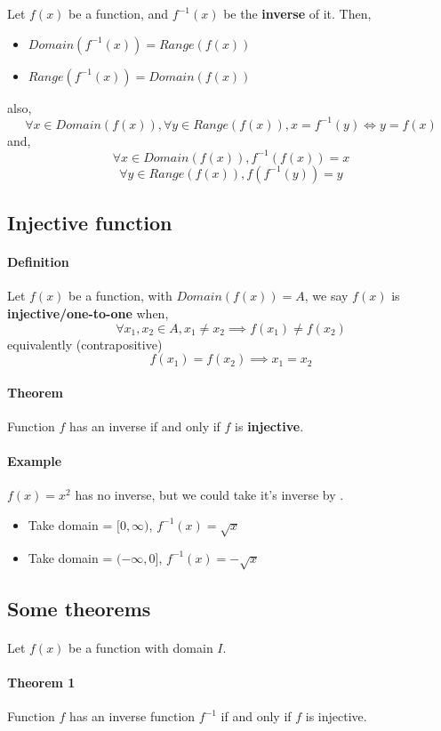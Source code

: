\documentclass{article}
\begin{document}
	Let $f(x)$ be a function, and $f^{-1}(x)$ be the \textbf{inverse} of it. Then,
	\begin{itemize}
		\item $Domain(f^{-1}(x)) = Range(f(x))$
		\item $Range(f^{-1}(x)) = Domain(f(x))$
	\end{itemize}
	also,
	\[
	\forall x \in Domain(f(x)), \forall y \in Range(f(x)),
	x = f^{-1}(y) \iff y = f(x)
	\]
	and,
	\[
	\forall x \in Domain(f(x)), f^{-1}(f(x)) = x
	\]
	\[
	\forall y \in Range(f(x)), f(f^{-1}(y)) = y
	\]
	\subsection{Injective function}
	\paragraph{Definition} Let $f(x)$ be a function, with $Domain(f(x))=A$, we say $f(x)$ is \textbf{injective/one-to-one} when,
	\[
	\forall x_1, x_2 \in A, x_1 \neq x_2 \implies f(x_1) \neq f(x_2)
	\]
	equivalently (contrapositive)
	\[
	f(x_1) = f(x_2) \implies x_1 = x_2
	\]
	\paragraph{Theorem} Function $f$ has an inverse if and only if $f$ is \textbf{injective}.
	\paragraph{Example} $f(x)=x^2$ has no inverse, but we could take it's inverse by .
	\begin{itemize}
		\item Take domain = $[0, \infty)$, $f^{-1}(x) = \sqrt{x}$
		\item Take domain = $(-\infty, 0]$, $f^{-1}(x) = - \sqrt{x}$
	\end{itemize}
	\subsection{Some theorems}
	\paragraph{} Let $f(x)$ be a function with domain $I$.
	\paragraph{Theorem 1} Function $f$ has an inverse function $f^{-1}$ if and only if $f$ is injective.
\end{document}
